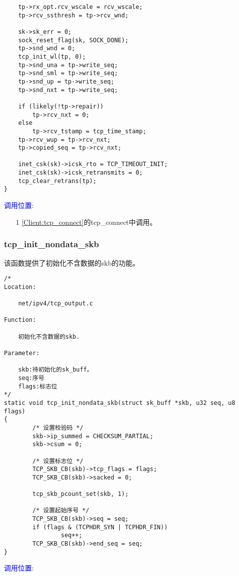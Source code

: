 \begin{verbatim}
    tp->rx_opt.rcv_wscale = rcv_wscale;
    tp->rcv_ssthresh = tp->rcv_wnd;

    sk->sk_err = 0;
    sock_reset_flag(sk, SOCK_DONE);
    tp->snd_wnd = 0;
    tcp_init_wl(tp, 0);
    tp->snd_una = tp->write_seq;
    tp->snd_sml = tp->write_seq;
    tp->snd_up = tp->write_seq;
    tp->snd_nxt = tp->write_seq;

    if (likely(!tp->repair))
        tp->rcv_nxt = 0;
    else
        tp->rcv_tstamp = tcp_time_stamp;
    tp->rcv_wup = tp->rcv_nxt;
    tp->copied_seq = tp->rcv_nxt;

    inet_csk(sk)->icsk_rto = TCP_TIMEOUT_INIT;
    inet_csk(sk)->icsk_retransmits = 0;
    tcp_clear_retrans(tp);
}
\end{verbatim}

        \textcolor{blue}{调用位置}:

            \begin{enumerate}
            \item[1]        \ref{Client:tcp_connect}的tcp\_connect中调用。
            \end{enumerate}
        \subsubsection{tcp\_init\_nondata\_skb}
            \label{TCPInitialize:tcp_init_nondata_skb}
            该函数提供了初始化不含数据的skb的功能。
\begin{verbatim}
/*
Location:

    net/ipv4/tcp_output.c
    
Function:

    初始化不含数据的skb.

Parameter:

    skb:待初始化的sk_buff。
    seq:序号
    flags:标志位
*/
static void tcp_init_nondata_skb(struct sk_buff *skb, u32 seq, u8 flags)
{
        /* 设置校验码 */
        skb->ip_summed = CHECKSUM_PARTIAL;
        skb->csum = 0;

        /* 设置标志位 */
        TCP_SKB_CB(skb)->tcp_flags = flags;
        TCP_SKB_CB(skb)->sacked = 0;

        tcp_skb_pcount_set(skb, 1);

        /* 设置起始序号 */
        TCP_SKB_CB(skb)->seq = seq;
        if (flags & (TCPHDR_SYN | TCPHDR_FIN))
                seq++;
        TCP_SKB_CB(skb)->end_seq = seq;
}
\end{verbatim}

        \textcolor{blue}{调用位置}:

